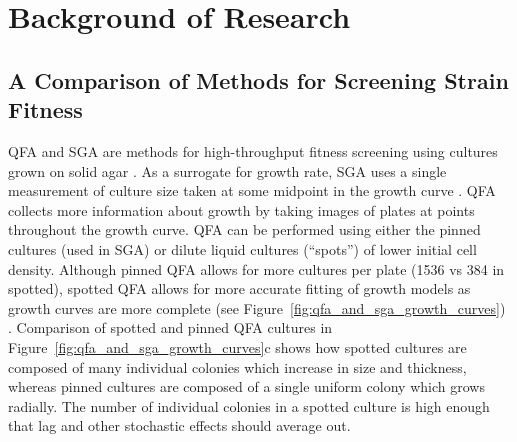 \graphicspath{{images_low_res/}}

\section{Background of Research}
\label{sec:background}

\subsection{A Comparison of Methods for Screening Strain Fitness }

QFA and SGA are methods for high-throughput fitness screening using cultures grown on
solid agar \citep{Baryshnikova2010sga,Banks2012}. As a surrogate for growth rate, SGA uses
a single measurement of culture size taken at some midpoint in the growth curve
\citep{Baryshnikova2010sga}. QFA collects more information about growth by taking images
of plates at points throughout the growth curve. QFA can be performed using either the
pinned cultures (used in SGA) or dilute liquid cultures (``spots'') of lower initial cell
density. Although pinned QFA allows for more cultures per plate (1536 vs 384 in spotted),
spotted QFA allows for more accurate fitting of growth models as growth curves are more
complete (see Figure~\ref{fig:qfa_and_sga_growth_curves}) \citep{Lawless2010}. Comparison
of spotted and pinned QFA cultures in Figure~\ref{fig:qfa_and_sga_growth_curves}c shows
how spotted cultures are composed of many individual colonies which increase in size and
thickness, whereas pinned cultures are composed of a single uniform colony which grows
radially. The number of individual colonies in a spotted culture is high enough that lag
and other stochastic effects should average out.


